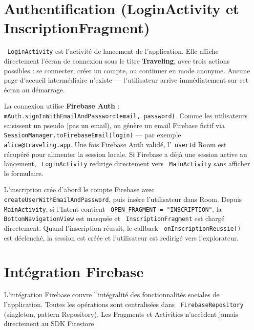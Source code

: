 \documentclass[a4paper,12pt,openany]{report}
\newcommand{\ic}[1]{\texttt{\small\colorbox{lightbg}{\color{navy!90} #1}}}
\begin{document}
\section{Authentification (LoginActivity et InscriptionFragment)}

\ic{LoginActivity} est l'activité de lancement de l'application. Elle affiche
directement l'écran de connexion sous le titre \textbf{Traveling}, avec trois
actions possibles : se connecter, créer un compte, ou continuer en mode anonyme.
Aucune page d'accueil intermédiaire n'existe — l'utilisateur arrive immédiatement
sur cet écran au démarrage.

La connexion utilise \textbf{Firebase Auth} : \ic{mAuth.signInWithEmailAndPassword(email, password)}.
Comme les utilisateurs saisissent un pseudo (pas un email), on génère un email Firebase
fictif via \ic{SessionManager.toFirebaseEmail(login)} — par exemple \ic{alice@traveling.app}.
Une fois Firebase Auth validé, l'\ic{userId} Room est récupéré pour alimenter la session locale.
Si Firebase a déjà une session active au lancement, \ic{LoginActivity} redirige directement
vers \ic{MainActivity} sans afficher le formulaire.

L'inscription crée d'abord le compte Firebase avec \ic{createUserWithEmailAndPassword},
puis insère l'utilisateur dans Room. Depuis \ic{MainActivity}, si l'Intent contient
\ic{OPEN\_FRAGMENT = "INSCRIPTION"}, la \ic{BottomNavigationView} est masquée et
\ic{InscriptionFragment} est chargé directement. Quand l'inscription réussit, le callback
\ic{onInscriptionReussie()} est déclenché, la session est créée et l'utilisateur est
redirigé vers l'explorateur.

\section{Intégration Firebase}

L'intégration Firebase couvre l'intégralité des fonctionnalités sociales de l'application.
Toutes les opérations sont centralisées dans \ic{FirebaseRepository} (singleton, pattern Repository).
Les Fragments et Activities n'accèdent jamais directement au SDK Firestore.
\end{document}
